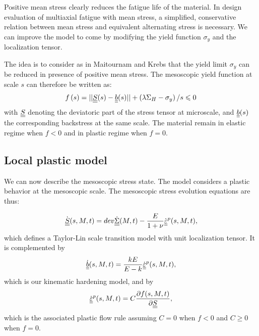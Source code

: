 Positive mean stress clearly reduces the fatigue life of the material. In design evaluation of multiaxial fatigue with mean stress, a simplified, conservative relation between mean stress and equivalent alternating stress is necessary. We can improve the model to come by modifying the yield function $\sigma_y$ and the localization tensor.

The idea is to consider as in Maitournam and Krebs\cite{Maitournam2011232} that the yield limit $\sigma_y$ can be reduced in presence of positive mean stress. The mesoscopic yield function at scale $s$ can therefore be written as:
\begin{equation}
f\left(s\right)=||\uline{\uline{S}}(s)-\uline{\uline{b}}(s)||+\left( \lambda \Sigma_H-\sigma_y\right) /s\leqslant 0
\label{yieldfun}
\end{equation}
with $\uline{\uline{S}}$ denoting the deviatoric part of the stress tensor at microscale, and $\uline{\uline{b}}(s)$ the corresponding backstress at the same scale. The material remain in elastic regime when $f<0$ and in plastic regime when $f=0$.

\subsection{Local plastic model}
We can now describe the mesoscopic stress state.  The model considers a plastic 
behavior at the mesoscopic scale. The mesoscopic stress evolution equations are thus:


\begin{equation}
\dot{\uline{\uline{S}}}(s,M,t)=dev\dot{\uline{\uline{\Sigma}}}(M,t)-\dfrac{E}{1+\nu}\dot{\uline{\uline{\varepsilon}}}^p(s,M,t), 
\label{eq.mesostress}
\end{equation}
which defines a Taylor-Lin scale transition model with unit localization tensor\cite{Bosia201239}. It is complemented by
\begin{equation}
\dot{\uline{\uline{b}}}(s,M,t)=\dfrac{kE}{E-k} \dot{\uline{\uline{\varepsilon}}}^p(s,M,t), 
\label{eq.backstress}
\end{equation}
which is our kinematic hardening model, and by
\begin{equation}
\dot{\uline{\uline{\varepsilon}}}^p(s,M,t)=C\dfrac{\partial f(s,M,t)}{\partial \uline{\uline{S}}}, 
\label{eq.plasticflow}
\end{equation}
which is the associated plastic flow rule assuming $C=0$ when $f<0$ and  $C\geqslant0$ when $f=0$.

